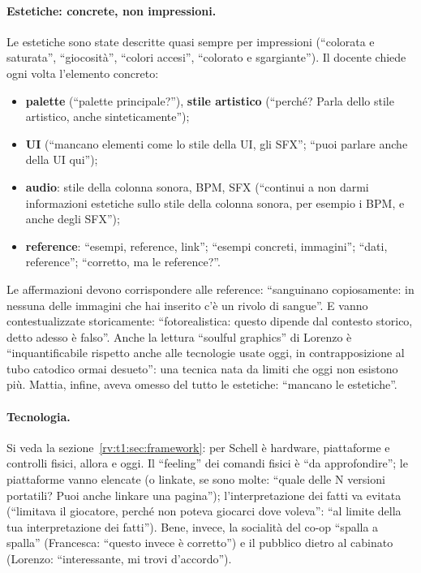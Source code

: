 \paragraph{Estetiche: concrete, non impressioni.} Le estetiche sono state
descritte quasi sempre per impressioni (``colorata e saturata'',
``giocosità'', ``colori accesi'', ``colorato e sgargiante''). Il docente
chiede ogni volta l'elemento concreto:
\begin{itemize}
  \item \textbf{palette} (``palette principale?''), \textbf{stile artistico}
        (``perché? Parla dello stile artistico, anche sinteticamente'');
  \item \textbf{UI} (``mancano elementi come lo stile della UI, gli SFX'';
        ``puoi parlare anche della UI qui'');
  \item \textbf{audio}: stile della colonna sonora, BPM, SFX (``continui a
        non darmi informazioni estetiche sullo stile della colonna sonora, per
        esempio i BPM, e anche degli SFX'');
  \item \textbf{reference}: ``esempi, reference, link''; ``esempi concreti,
        immagini''; ``dati, reference''; ``corretto, ma le reference?''.
\end{itemize}
Le affermazioni devono corrispondere alle reference: ``sanguinano
copiosamente: in nessuna delle immagini che hai inserito c'è un rivolo di
sangue''. E vanno contestualizzate storicamente: ``fotorealistica: questo
dipende dal contesto storico, detto adesso è falso''. Anche la lettura
``soulful graphics'' di Lorenzo è ``inquantificabile rispetto anche alle
tecnologie usate oggi, in contrapposizione al tubo catodico ormai desueto'':
una tecnica nata da limiti che oggi non esistono più. Mattia, infine, aveva
omesso del tutto le estetiche: ``mancano le estetiche''.

\paragraph{Tecnologia.} Si veda la sezione~\ref{rv:t1:sec:framework}: per
Schell è hardware, piattaforme e controlli fisici, allora e oggi. Il
``feeling'' dei comandi fisici è ``da approfondire''; le piattaforme vanno
elencate (o linkate, se sono molte: ``quale delle N versioni portatili? Puoi
anche linkare una pagina''); l'interpretazione dei fatti va evitata (``limitava
il giocatore, perché non poteva giocarci dove voleva'': ``al limite della tua
interpretazione dei fatti''). Bene, invece, la socialità del co-op ``spalla a
spalla'' (Francesca: ``questo invece è corretto'') e il pubblico dietro al
cabinato (Lorenzo: ``interessante, mi trovi d'accordo'').

